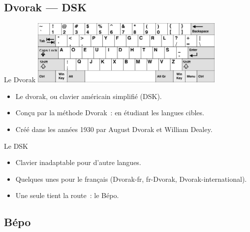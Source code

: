 \subsection{Dvorak — DSK}

\begin{frame}{Le Dvorak}
    \centering
    \includegraphics[height=90pt]{images/dvorak.png}
    \pause

    \begin{itemize}
	\item Le dvorak, ou clavier américain simplifié (DSK). \pause

	\item Conçu par la méthode Dvorak~: en étudiant les langues
          cibles. \pause

	\item Créé dans les années 1930 par August Dvorak et William Dealey.
    \end{itemize}
\end{frame}

\begin{frame}{Le DSK}
    \begin{itemize}
	\item Clavier inadaptable pour d’autre langues. \pause

	\item Quelques unes pour le français (Dvorak-fr, fr-Dvorak,
          Dvorak-international). \pause

	\item Une seule tient la route~: le Bépo.
    \end{itemize}
\end{frame}



\subsection{Bépo}

